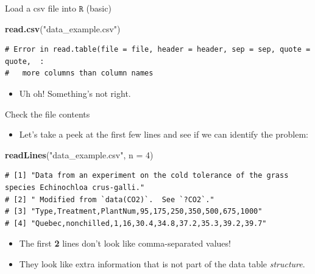 \documentclass[
  11pt,
  ignorenonframetext,
]{beamer}
\newenvironment{Shaded}{\begin{snugshade}}{\end{snugshade}}
\newcommand{\AttributeTok}[1]{\textcolor[rgb]{0.13,0.29,0.53}{#1}}
\newcommand{\DecValTok}[1]{\textcolor[rgb]{0.00,0.00,0.81}{#1}}
\newcommand{\FunctionTok}[1]{\textcolor[rgb]{0.13,0.29,0.53}{\textbf{#1}}}
\newcommand{\NormalTok}[1]{#1}
\newcommand{\StringTok}[1]{\textcolor[rgb]{0.31,0.60,0.02}{#1}}
\providecommand{\tightlist}{%
  \setlength{\itemsep}{0pt}\setlength{\parskip}{0pt}}
\newcommand{\R}{\texttt{R}}
\begin{document}
\begin{frame}[fragile]{Load a csv file into \(\R\) (basic)}
\protect\hypertarget{load-a-csv-file-into-r-basic}{}
\begin{Shaded}
\begin{Highlighting}[]
\FunctionTok{read.csv}\NormalTok{(}\StringTok{"data\_example.csv"}\NormalTok{)}
\end{Highlighting}
\end{Shaded}

\begin{verbatim}
# Error in read.table(file = file, header = header, sep = sep, quote = quote,  : 
#   more columns than column names
\end{verbatim}

\pause

\begin{itemize}
\tightlist
\item
  Uh oh! Something's not right.
\end{itemize}
\end{frame}

\begin{frame}[fragile]{Check the file contents}
\protect\hypertarget{check-the-file-contents}{}
\begin{itemize}
\tightlist
\item
  Let's take a peek at the first few lines and see if we can identify
  the problem:
\end{itemize}

\begin{Shaded}
\begin{Highlighting}[]
\FunctionTok{readLines}\NormalTok{(}\StringTok{"data\_example.csv"}\NormalTok{, }\AttributeTok{n =} \DecValTok{4}\NormalTok{)}
\end{Highlighting}
\end{Shaded}

\begin{verbatim}
# [1] "Data from an experiment on the cold tolerance of the grass species Echinochloa crus-galli."
# [2] " Modified from `data(CO2)`.  See `?CO2`."                                                  
# [3] "Type,Treatment,PlantNum,95,175,250,350,500,675,1000"                                       
# [4] "Quebec,nonchilled,1,16,30.4,34.8,37.2,35.3,39.2,39.7"
\end{verbatim}

\pause

\begin{itemize}
\item
  The first \textbf{2} lines don't look like comma-separated values!
\item
  They look like extra information that is not part of the data table
  \emph{structure}.
\end{itemize}
\end{frame}
\end{document}
